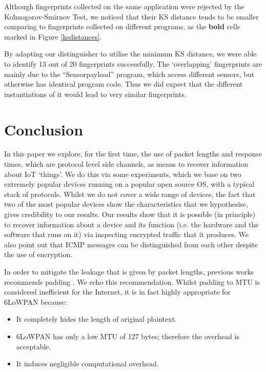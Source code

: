 \documentclass{article}
\begin{document}
Although fingerprints collected on the same application were rejected by the Kolmogorov-Smirnov Test, we noticed that their KS distance tends to be smaller comparing to fingerprints collected on different programs, as the \textbf{bold} cells marked in Figure \ref{ksdistances}. 

By adapting our distinguisher to utilise the minimum KS distance, we were able to identify 13 out of 20 fingerprints successfully. The `overlapping' fingerprints are mainly due to the ``Sensorpayload'' program, which access different sensors, but otherwise has identical program code. Thus we did expect that the different instantiations of it would lead to very similar fingerprints. 

\section{Conclusion}

In this paper we explore, for the first time, the use of packet lengths and response times, which are protocol level side channels, as means to recover information about IoT `things'. We do this via some experiments, which we base on two extremely popular devices running on a popular open source OS, with a typical stack of protocols. Whilst we do not cover a wide range of devices, the fact that two of the most popular devices show the characteristics that we hypothesise, gives credibility to our results. Our results show that it is possible (in principle) to recover information about a device and its function (i.e. the hardware and the software that runs on it) via inspecting encrypted traffic that it produces. We also point out that ICMP messages can be distinguished from each other despite the use of encryption. 

In order to mitigate the leakage that is given by packet lengths, previous works recommends padding \cite{Peekaboo}. We echo this recommendation. Whilst padding to MTU is considered inefficient for the Internet, it is in fact highly appropriate for 6LoWPAN because:
\begin{itemize}
	\item It completely hides the length of original plaintext.
	\item 6LoWPAN has only a low MTU of 127 bytes; therefore the overhead is acceptable.
	\item It induces negligible computational overhead.
\end{itemize}

\end{document}
